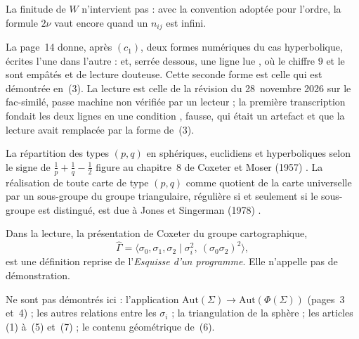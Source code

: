 \begin{remarque}
La finitude de $W$ n'intervient pas : avec la convention adoptée pour l'ordre, la formule $2\nu$ vaut encore quand un $n_{ij}$ est infini.
\end{remarque}

\begin{remarque}
La page~14 donne, après $(c_1)$, deux formes numériques du cas hyperbolique, écrites l'une dans l'autre :  et, serrée dessous, une ligne lue , où le chiffre $9$ et le  sont empâtés et de lecture douteuse. Cette seconde forme est celle qui est démontrée en~(3). La lecture est celle de la révision du 28~novembre 2026 sur le fac-similé, passe machine non vérifiée par un lecteur ; la première transcription fondait les deux lignes en une condition , fausse, qui était un artefact et que la lecture avait remplacée par la forme de~(3).
\end{remarque}

\begin{remarque}
La répartition des types $(p, q)$ en sphériques, euclidiens et hyperboliques selon le signe de $\frac1p + \frac1q - \frac12$ figure au chapitre~8 de Coxeter et Moser (1957) \cite{coxetermoser1957}. La réalisation de toute carte de type $(p, q)$ comme quotient de la carte universelle par un sous-groupe du groupe triangulaire, régulière si et seulement si le sous-groupe est distingué, est due à Jones et Singerman (1978) \cite{jonessingerman1978}.
\end{remarque}

\begin{remarque}
Dans la lecture, la présentation de Coxeter du groupe cartographique,
\[
\widehat\Gamma = \langle \sigma_0, \sigma_1, \sigma_2 \mid \sigma_i^2,\ (\sigma_0\sigma_2)^2 \rangle,
\]
est une définition reprise de l'\emph{Esquisse d'un programme}. Elle n'appelle pas de démonstration.
\end{remarque}

Ne sont pas démontrés ici : l'application $\mathrm{Aut}(\Sigma) \to \mathrm{Aut}(\Phi(\Sigma))$ (pages~3 et~4) ; les autres relations entre les $\sigma_i$ ; la triangulation de la sphère ; les articles (1) à~(5) et~(7) ; le contenu géométrique de~(6).
